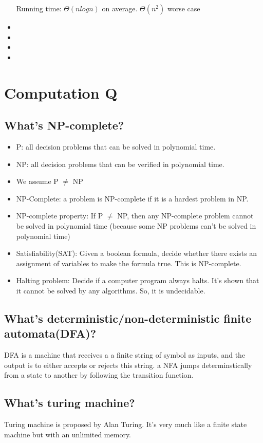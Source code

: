 \documentclass[12pt, landscape]{article}
\begin{document}
\begin{multicols}{2}
\begin{itemize}
Running time: $\Theta (nlogn)$ on average. $\Theta (n^2)$ worse case
\item
\item
\item
\item
\end{itemize}



\section{Computation Q}
\subsection{What's  NP-complete?}
\begin{itemize}
\item P: all decision problems that can be solved in polynomial time.
\item NP: all decision problems that can be verified in polynomial time.
\item We assume P $\neq$ NP
\item NP-Complete: a problem is NP-complete if it is a hardest problem in NP.
\item NP-complete property: If P $\neq$ NP, then any NP-complete problem cannot be solved in polynomial time (because some NP problems can't be solved in polynomial time)
\item Satisfiability(SAT): Given a boolean formula, decide whether there exists an assignment of variables to make the formula true. This is NP-complete.
\item Halting problem: Decide if a computer program always halts. It's shown that it cannot be solved by any algorithms. So, it is undecidable.
\end{itemize}
\subsection{What's deterministic/non-deterministic finite automata(DFA)?}
DFA is a machine that receives a a finite string of symbol as inputs, and the output is to either accepts or rejects this string. 
a NFA jumps determinstically from a state to another by following the transition function. 
\subsection{What's turing machine?}
Turing machine is proposed by Alan Turing. It's very much like a finite state machine but with an unlimited memory.


\end{multicols}
\end{document}

